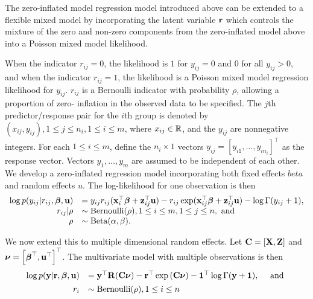 The zero-inflated model regression model introduced above can be extended to a
flexible mixed model by incorporating the latent variable ${\bf r}$ which controls
the mixture of the zero and non-zero components from the zero-inflated model
above into a Poisson mixed model likelihood.

When the indicator $r_{ij} = 0$, the likelihood is $1$ for $y_{ij} = 0$ and $0$
for all $y_{ij} > 0$, and when the indicator $r_{ij} = 1$, the likelihood is a
Poisson mixed model regression likelihood for $y_{ij}$.  $r_{ij}$ is a
Bernoulli indicator with probability $\rho$, allowing a proportion of zero-
inflation in the observed data to be specified. The $j$th predictor/response
pair for the $i$th group is denoted by $(x_{ij}, y_{ij}), 1 \leq j \leq n_i, 1
\leq i \leq m$, where $x_{ij} \in {\mathbb{R}}$, and the $y_{ij}$ are nonnegative
integers. For each $1 \leq i \leq m$, define the $n_i \times 1$ vectors $y_{ij}
= [y_{i 1}, \ldots, y_{i n_i}]^\top$ as the response vector. Vectors $y_1,
\ldots, y_m$ are assumed to be independent of each other.  We develop a
zero-inflated regression model incorporating both fixed effects $beta$ and
random effects $u$. The log-likelihood for one observation is then
\begin{equation*}
	\begin{array}{rl}
		\log p(y_{ij} | r_{ij}, {\boldsymbol \beta}, {\bf u}) & = y_{ij} r_{ij} ({\bf x}_i^\top {\boldsymbol\beta} + {\bf z}_{ij}^\top {\bf u}) - r_{ij} \exp ({\bf x}_{ij}^\top {\boldsymbol\beta} + {\bf z}_{ij}^\top {\bf u}) - \log \Gamma (y_{ij} + 1), \\
		r_{ij} | \rho                  & \sim \text{Bernoulli}(\rho), 1 \leq i \leq m, 1 \leq j \leq n, \text{ and }                                                              \\
		\rho                        & \sim \text{Beta}(\alpha, \beta).                                                                                              \\
	\end{array}
\end{equation*}

\noindent We now extend this to multiple dimensional random effects. Let ${\bf C} =
[{\bf X}, {\bf Z}]$ and ${\boldsymbol \nu} = \left[ {\boldsymbol \beta}^\top, {\bf u}^\top \right]^\top$. The
multivariate model with multiple observations is then 
\begin{equation*}
    \begin{array}{rl} \log{p({\bf y}|{\bf r}, {\boldsymbol\beta}, {\bf u})} &= {\bf y}^\top {\bf R} ({\bf C}{\boldsymbol \nu})
        - {\bf r}^\top \exp{({\bf C}{\boldsymbol\nu})} - {\bf 1}^\top \log{\Gamma{({\bf y}+ {\bf1})}},
        \quad \mbox{ and } \\
        [1ex] r_i& \sim \text{Bernoulli}(\rho), 1 \leq i \leq n \\ 
    \end{array} 
\end{equation*}

